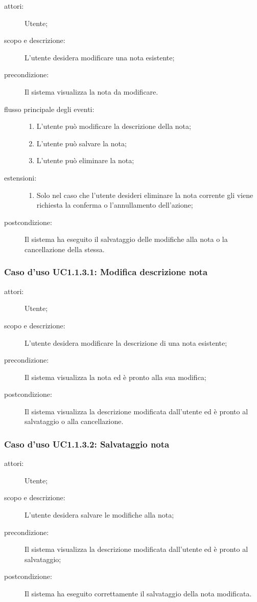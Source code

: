 \begin{description}
\item[attori:] Utente;
\item[scopo e descrizione:] L'utente desidera modificare una nota esistente;
\item[precondizione:] Il sistema visualizza la nota da modificare.
\item[flusso principale degli eventi:] \hfill 
	\begin{enumerate}
	\item L'utente può modificare la descrizione della nota;
	\item L'utente può salvare la nota;
	\item L'utente può eliminare la nota;
	\end{enumerate}
\item[estensioni:] \hfill
	\begin{enumerate}
	\item Solo nel caso che l'utente desideri eliminare la nota corrente gli viene richiesta la conferma o l'annullamento dell'azione;
	\end{enumerate}
\item[postcondizione:] Il sistema ha eseguito il salvataggio delle modifiche alla nota o la cancellazione della stessa.
\end{description}

\subsubsection{Caso d'uso UC1.1.3.1: Modifica descrizione nota}
\begin{description}
\item[attori:] Utente;
\item[scopo e descrizione:] L'utente desidera modificare la descrizione di una nota esistente;
\item[precondizione:] Il sistema visualizza la nota ed è pronto alla sua modifica;
\item[postcondizione:] Il sistema visualizza la descrizione modificata dall'utente ed è pronto al salvataggio o alla cancellazione.
\end{description}

\subsubsection{Caso d'uso UC1.1.3.2: Salvataggio nota}
\begin{description}
\item[attori:] Utente;
\item[scopo e descrizione:] L'utente desidera salvare le modifiche alla nota;
\item[precondizione:] Il sistema visualizza la descrizione modificata dall'utente ed è pronto al salvataggio;
\item[postcondizione:] Il sistema ha eseguito correttamente il salvataggio della nota modificata.
\end{description}

